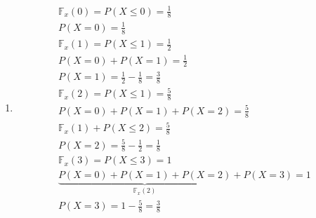 \begin{description}
\begin{enumerate}[label= (\alph*)]
       \item
         \begin{align*}
           \mathbb{F}_{x}(0)= P(X \le 0)= \frac{1}{8}\\
           P(X=0)= \frac{1}{8}\\
           \mathbb{F}_{x}(1)= P(X \le 1)= \frac{1}{2}\\
           P(X=0)+P(X=1)= \frac{1}{2} \\
           P(X=1)= \frac{1}{2}- \frac{1}{8}= \frac{3}{8}\\
           \mathbb{F}_{x}(2)= P(X \le 1)= \frac{5}{8}\\
           P(X=0)+P(X=1)+P(X=2)= \frac{5}{8}\\
           \mathbb{F}_{x} (1) + P(X \le 2 )=\frac{5}{8}\\
           P(X=2)= \frac{5}{8}- \frac{1}{2}= \frac{1}{8}\\
           \mathbb{F}_{x}(3)= P(X \le 3)= 1\\
           \underbrace{P(X=0)+ P(X=1)+ P(X=2)}_{\mathbb{F}_{x}(2)} + P(X=3)=1\\
           P(X =3) = 1- \frac{5}{8}= \frac{3}{8}
         \end{align*}
     \end{enumerate}
 \end{description}
